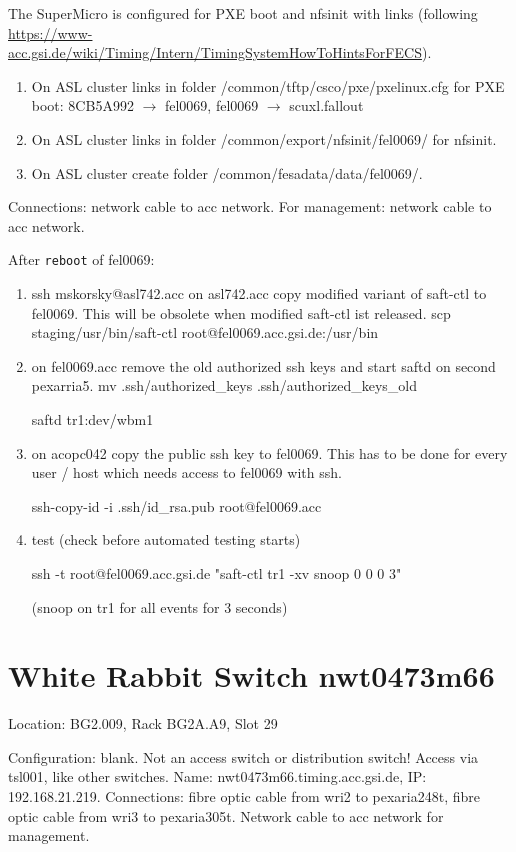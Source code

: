 \documentclass[12pt,a4paper]{report}
\begin{document}
The SuperMicro is configured for PXE boot and nfsinit with links (following
\url{https://www-acc.gsi.de/wiki/Timing/Intern/TimingSystemHowToHintsForFECS}).
\begin{enumerate}
\item On ASL cluster links in folder /common/tftp/csco/pxe/pxelinux.cfg for PXE boot:
8CB5A992 $\to$ fel0069,
fel0069 $\to$ scuxl.fallout
\item On ASL cluster links in folder /common/export/nfsinit/fel0069/ for nfsinit.
\item On ASL cluster create folder /common/fesadata/data/fel0069/.
\end{enumerate}
Connections: network cable to acc network. For management: network cable to acc network.

After \texttt{reboot} of fel0069:
\begin{enumerate}
\item ssh mskorsky@asl742.acc
on asl742.acc copy modified variant of saft-ctl to fel0069. This will be obsolete when modified saft-ctl ist released.\linebreak
scp staging/usr/bin/saft-ctl root@fel0069.acc.gsi.de:/usr/bin

\item on fel0069.acc remove the old authorized ssh keys and start saftd on second pexarria5.
\linebreak mv .ssh/authorized\_keys .ssh/authorized\_keys\_old \raggedright
\linebreak saftd tr1:dev/wbm1 \raggedright

\item on acopc042 copy the public ssh key to fel0069. This has to be done for every user / host which needs access to fel0069 with ssh.\raggedright
\linebreak ssh-copy-id -i .ssh/id\_rsa.pub root@fel0069.acc

\item test (check before automated testing starts)\raggedright
\linebreak ssh -t root@fel0069.acc.gsi.de "saft-ctl tr1 -xv snoop 0 0 0 3"\raggedright
\linebreak (snoop on tr1 for all events for 3 seconds)
\end{enumerate}

\section{White Rabbit Switch nwt0473m66}
Location: BG2.009, Rack BG2A.A9, Slot 29 \raggedright
\linebreak Configuration: blank. Not an access switch or distribution switch!
\linebreak Access via tsl001, like other switches.
\linebreak Name: nwt0473m66.timing.acc.gsi.de,
\linebreak IP: 192.168.21.219.
\linebreak Connections: fibre optic cable from wri2 to pexaria248t, fibre optic cable from wri3 to pexaria305t. Network cable to acc network for management.
\end{document}
